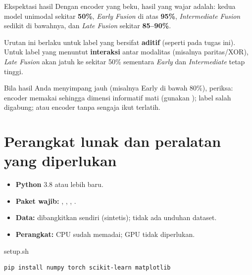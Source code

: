 \documentclass[12pt, a4paper]{article}
\begin{document}
\begin{minipage}{\linewidth}
\begin{bclogo}[couleur=ctpMantle, arrondi=0.1, logo=\bcinfo, ombre=false, couleurBord=ctpSurface, epBord=0.6]{Ekspektasi hasil}
  Dengan encoder  yang beku, hasil yang wajar adalah: kedua model unimodal
  sekitar \textbf{50\%}, \emph{Early Fusion} di atas \textbf{95\%},
  \emph{Intermediate Fusion} sedikit di bawahnya, dan \emph{Late Fusion}
  sekitar \textbf{85--90\%}.

  Urutan ini berlaku untuk label yang bersifat \textbf{aditif} (seperti pada tugas
  ini). Untuk label yang menuntut \textbf{interaksi} antar modalitas (misalnya
  paritas/XOR), \emph{Late Fusion} akan jatuh ke sekitar 50\% sementara
  \emph{Early} dan \emph{Intermediate} tetap tinggi.

  Bila hasil Anda menyimpang jauh (misalnya Early di bawah 80\%), periksa: encoder
  memakai  sehingga dimensi informatif mati (gunakan );
  label salah digabung; atau encoder tanpa sengaja ikut terlatih.
\end{bclogo}
\end{minipage}

\section{Perangkat lunak dan peralatan yang diperlukan}\label{sec:requiredsw}

\begin{itemize}[itemsep=2pt,parsep=0pt,topsep=2pt,partopsep=2pt]
  \item[\color{ctpBlue}\faPython] \textbf{Python} 3.8 atau lebih baru.
  \item[\color{ctpBlue}\faFileCode] \textbf{Paket wajib:} , , , .
  \item[\color{ctpBlue}\faDownload] \textbf{Data:} dibangkitkan sendiri (sintetis); tidak ada unduhan dataset.
  \item[\color{ctpBlue}\faFileCode] \textbf{Perangkat:} CPU sudah memadai; GPU tidak diperlukan.
\end{itemize}

\begin{codewindow}{setup.sh}
\begin{lstlisting}[style=pycode]
pip install numpy torch scikit-learn matplotlib
\end{lstlisting}
\end{codewindow}
\end{document}
